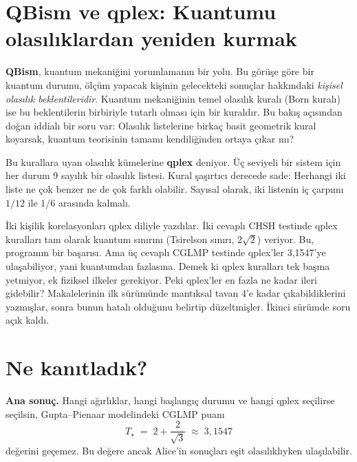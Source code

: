 \documentclass[11pt]{article}
\begin{document}
\section{QBism ve qplex: Kuantumu olasılıklardan yeniden kurmak}

\textbf{QBism}, kuantum mekaniğini yorumlamanın bir yolu. Bu görüşe göre bir kuantum durumu, ölçüm yapacak
kişinin gelecekteki sonuçlar hakkındaki \emph{kişisel olasılık beklentileridir}. Kuantum mekaniğinin
temel olasılık kuralı (Born kuralı) ise bu beklentilerin birbiriyle tutarlı olması için bir kuraldır. Bu
bakış açısından doğan iddialı bir soru var: Olasılık listelerine birkaç basit geometrik kural koyarsak,
kuantum teorisinin tamamı kendiliğinden ortaya çıkar mı?

Bu kurallara uyan olasılık kümelerine \textbf{qplex} deniyor. Üç seviyeli bir sistem için her durum 9
sayılık bir olasılık listesi. Kural şaşırtıcı derecede sade: Herhangi iki liste ne çok benzer ne de çok
farklı olabilir. Sayısal olarak, iki listenin iç çarpımı $1/12$ ile $1/6$ arasında kalmalı.

\begin{sezgi}
İki kişilik korelasyonları qplex diliyle yazdılar. İki cevaplı CHSH testinde qplex kuralları tam
olarak kuantum sınırını (Tsirelson sınırı, $2\sqrt2$) veriyor. Bu, programın bir başarısı. Ama üç
cevaplı CGLMP testinde qplex'ler 3,1547'ye ulaşabiliyor, yani kuantumdan fazlasına. Demek ki qplex
kuralları tek başına yetmiyor, ek fiziksel ilkeler gerekiyor. Peki qplex'ler en fazla ne kadar ileri
gidebilir? Makalelerinin ilk sürümünde mantıksal tavan 4'e kadar çıkabildiklerini yazmışlar, sonra bunun
hatalı olduğunu belirtip düzeltmişler. İkinci sürümde soru açık kaldı.
\end{sezgi}

\section{Ne kanıtladık?}

\begin{sonuc}
{\sffamily\bfseries\color{ana} Ana sonuç.} Hangi ağırlıklar, hangi başlangıç durumu ve hangi qplex seçilirse
seçilsin, Gupta–Pienaar modelindeki CGLMP puanı
\[
  T_\star \;=\; 2+\frac{2}{\sqrt3}\;\approx\;3{,}1547
\]
değerini geçemez. Bu değere ancak Alice'in sonuçları eşit olasılıklıyken ulaşılabilir.
\end{sonuc}
\end{document}
